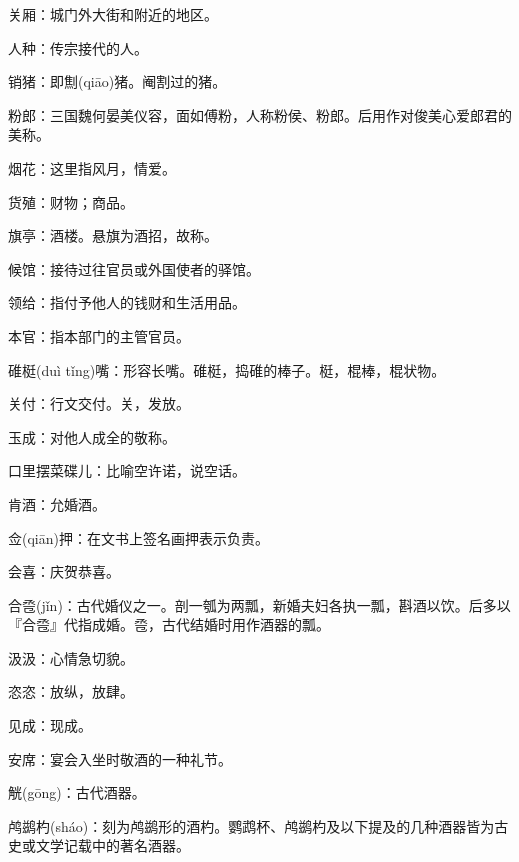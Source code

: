 \startbuffer[1654]
关厢：城门外大街和附近的地区。
\stopbuffer


\startbuffer[1655]
人种：传宗接代的人。
\stopbuffer


\startbuffer[1656]
销猪：即劁(qiāo)猪。阉割过的猪。
\stopbuffer


\startbuffer[1657]
粉郎：三国魏何晏美仪容，面如傅粉，人称粉侯、粉郎。后用作对俊美心爱郎君的美称。
\stopbuffer


\startbuffer[1658]
烟花：这里指风月，情爱。
\stopbuffer


\startbuffer[1659]
货殖：财物；商品。
\stopbuffer


\startbuffer[1660]
旗亭：酒楼。悬旗为酒招，故称。
\stopbuffer


\startbuffer[1661]
候馆：接待过往官员或外国使者的驿馆。
\stopbuffer


\startbuffer[1662]
领给：指付予他人的钱财和生活用品。
\stopbuffer


\startbuffer[1663]
本官：指本部门的主管官员。
\stopbuffer


\startbuffer[1664]
碓梃(duì tǐng)嘴：形容长嘴。碓梃，捣碓的棒子。梃，棍棒，棍状物。
\stopbuffer


\startbuffer[1665]
关付：行文交付。关，发放。
\stopbuffer


\startbuffer[1666]
玉成：对他人成全的敬称。
\stopbuffer


\startbuffer[1667]
口里摆菜碟儿：比喻空许诺，说空话。
\stopbuffer


\startbuffer[1668]
肯酒：允婚酒。
\stopbuffer


\startbuffer[1669]
佥(qiān)押：在文书上签名画押表示负责。
\stopbuffer


\startbuffer[1670]
会喜：庆贺恭喜。
\stopbuffer


\startbuffer[1671]
合卺(jǐn)：古代婚仪之一。剖一瓠为两瓢，新婚夫妇各执一瓢，斟酒以饮。后多以『合卺』代指成婚。卺，古代结婚时用作酒器的瓢。
\stopbuffer


\startbuffer[1672]
汲汲：心情急切貌。
\stopbuffer


\startbuffer[1673]
恣恣：放纵，放肆。
\stopbuffer


\startbuffer[1674]
见成：现成。
\stopbuffer


\startbuffer[1675]
安席：宴会入坐时敬酒的一种礼节。
\stopbuffer


\startbuffer[1676]
觥(gōng)：古代酒器。
\stopbuffer


\startbuffer[1677]
鸬鹚杓(sháo)：刻为鸬鹚形的酒杓。鹦鹉杯、鸬鹚杓及以下提及的几种酒器皆为古史或文学记载中的著名酒器。
\stopbuffer


